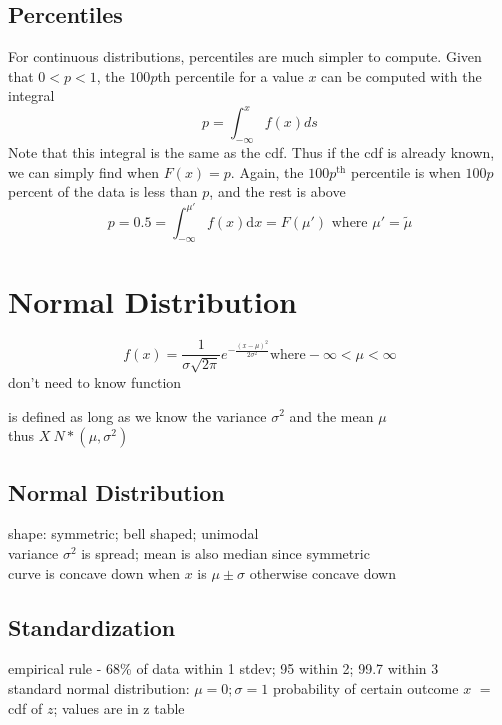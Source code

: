 \subsection{Percentiles}  %
For continuous distributions, percentiles are much simpler to compute. Given that $0<p<1$, the $100p$th percentile for a value $x$ can be computed with the integral
\begin{equation}
    p=\int_{-\infty}^{x} f(x)ds
\end{equation}
Note that this integral is the same as the cdf. Thus if the cdf is already known, we can simply find when $F(x)=p$. Again, the $100p^{\text{th}}$ percentile is when $100p$ percent of the data is less than $p$, and the rest is above\\
\begin{equation}
    p=0.5=\int_{-\infty}^{\mu'} f(x)\mathrm{d}x=F(\mu')\text{ where } \mu'=\tilde{\mu}
\end{equation}

\section{Normal Distribution}  %
\begin{equation}
    f(x)=\frac{1}{\sigma \sqrt{2\pi}}e^{-\frac{(x-\mu)^2}{2\sigma^2}} \mathrm{ where } -\infty<\mu<\infty
\end{equation}
don't need to know function

is defined as long as we know the variance $\sigma^2$ and the mean $\mu$ \\
thus $X~N*(\mu, \sigma^2)$
\subsection{Normal Distribution}  %
shape: symmetric; bell shaped; unimodal \\
variance $\sigma^2$ is spread; mean is also median since symmetric \\
curve is concave down when $x$ is $\mu\pm\sigma$ otherwise concave down

\subsection{Standardization}  %
empirical rule - 68\% of data within 1 stdev; 95 within 2; 99.7 within 3 \\
standard normal distribution: $\mu=0; \sigma=1$
probability of certain outcome $x$ $=$ cdf of $z$; values are in z table \\

